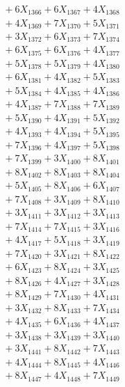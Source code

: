 \documentclass[a4paper,10pt]{article}
\begin{document}
{\begin{align}
&\;  + 6 X_{1366} + 6 X_{1367} + 4 X_{1368} \\[0.3ex]
&\;  + 4 X_{1369} + 7 X_{1370} + 5 X_{1371} \\[0.3ex]
&\;  + 3 X_{1372} + 6 X_{1373} + 7 X_{1374} \\[0.3ex]
&\;  + 6 X_{1375} + 6 X_{1376} + 4 X_{1377} \\[0.3ex]
&\;  + 5 X_{1378} + 5 X_{1379} + 4 X_{1380} \\[0.3ex]
&\;  + 6 X_{1381} + 4 X_{1382} + 5 X_{1383} \\[0.3ex]
&\;  + 5 X_{1384} + 4 X_{1385} + 4 X_{1386} \\[0.3ex]
&\;  + 4 X_{1387} + 7 X_{1388} + 7 X_{1389} \\[0.5ex]\allowbreak
&\;  + 5 X_{1390} + 4 X_{1391} + 5 X_{1392} \\[0.3ex]
&\;  + 4 X_{1393} + 4 X_{1394} + 5 X_{1395} \\[0.3ex]
&\;  + 7 X_{1396} + 4 X_{1397} + 5 X_{1398} \\[0.3ex]
&\;  + 7 X_{1399} + 3 X_{1400} + 8 X_{1401} \\[0.3ex]
&\;  + 8 X_{1402} + 8 X_{1403} + 8 X_{1404} \\[0.3ex]
&\;  + 5 X_{1405} + 8 X_{1406} + 6 X_{1407} \\[0.3ex]
&\;  + 7 X_{1408} + 3 X_{1409} + 8 X_{1410} \\[0.3ex]
&\;  + 3 X_{1411} + 3 X_{1412} + 3 X_{1413} \\[0.3ex]
&\;  + 7 X_{1414} + 7 X_{1415} + 3 X_{1416} \\[0.3ex]
&\;  + 4 X_{1417} + 5 X_{1418} + 3 X_{1419} \\[0.5ex]\allowbreak
&\;  + 7 X_{1420} + 3 X_{1421} + 8 X_{1422} \\[0.3ex]
&\;  + 6 X_{1423} + 8 X_{1424} + 3 X_{1425} \\[0.3ex]
&\;  + 8 X_{1426} + 4 X_{1427} + 3 X_{1428} \\[0.3ex]
&\;  + 8 X_{1429} + 7 X_{1430} + 4 X_{1431} \\[0.3ex]
&\;  + 3 X_{1432} + 8 X_{1433} + 7 X_{1434} \\[0.3ex]
&\;  + 4 X_{1435} + 6 X_{1436} + 4 X_{1437} \\[0.3ex]
&\;  + 3 X_{1438} + 3 X_{1439} + 3 X_{1440} \\[0.3ex]
&\;  + 3 X_{1441} + 8 X_{1442} + 7 X_{1443} \\[0.3ex]
&\;  + 4 X_{1444} + 8 X_{1445} + 4 X_{1446} \\[0.3ex]
&\;  + 8 X_{1447} + 4 X_{1448} + 7 X_{1449} \\[0.5ex]\allowbreak

\end{align}}
\end{document}
